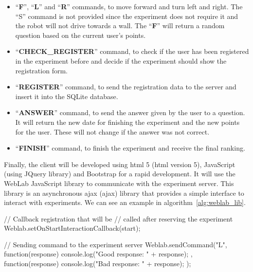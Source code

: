 \begin{itemize}
	\item ``\textbf{F}'', ``\textbf{L}'' and ``\textbf{R}'' commands, to move forward and turn left
	and right. The ``S'' command is not provided since the experiment does not require it and the
	robot will not drive towards a wall. The ``\textbf{F}'' will return a random question based on
	the current user's points.

	\item ``\textbf{CHECK\_REGISTER}'' command, to check if the user has been registered in the
	experiment before and decide if the experiment should show the registration form.

	\item ``\textbf{REGISTER}'' command, to send the registration data to the server and insert it
	into the SQLite database.

	\item ``\textbf{ANSWER}'' command, to send the answer given by the user to a question. It will
	return the new date for finishing the experiment and the new points for the user. These will not
	change if the answer was not correct.

	\item ``\textbf{FINISH}'' command, to finish the experiment and receive the final ranking.
\end{itemize}

Finally, the client will be developed using \acrshort{html} 5 (\acrlong{html} version 5), JavaScript
(using JQuery library) and Bootstrap for a rapid development. It will use the WebLab JavaScript
library to communicate with the experiment server. This library is an asynchronous \acrshort{ajax}
(\acrlong{ajax}) library that provides a simple interface to interact with experiments. We can see
an example in algorithm~\ref{alg:weblab_lib}.

\begin{center}
\begin{minipage}{.9\textwidth}
\singlespace
{}
\begin{pyglist}[language=javascript, caption={WebLab JavaScript library example.},
	label={alg:weblab_lib}, listingname={Algorithm}, numbers=left]
// Callback registration that will be
// called after reserving the experiment
Weblab.setOnStartInteractionCallback(start);

// Sending command to the experiment server
Weblab.sendCommand("L", function(response) {
	console.log("Good response: " + response);
}, function(response) {
	console.log("Bad response: " + response);
});
\end{pyglist}
\end{minipage}
\end{center}

